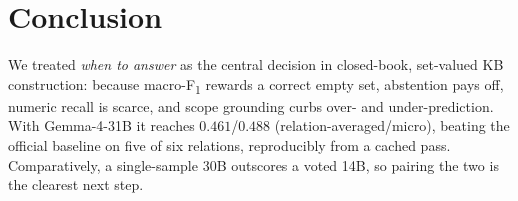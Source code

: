 \section{Conclusion}
We treated \emph{when to answer} as the central decision in closed-book,
set-valued KB construction: because macro-F\textsubscript{1} rewards a correct empty
set, abstention pays off, numeric recall is scarce, and scope grounding curbs over-
and under-prediction. With Gemma-4-31B it reaches $0.461$/$0.488$
(relation-averaged/micro), beating the official baseline on five of six relations,
reproducibly from a cached pass. Comparatively, a single-sample 30B outscores a
voted 14B, so pairing the two is the clearest next step.
